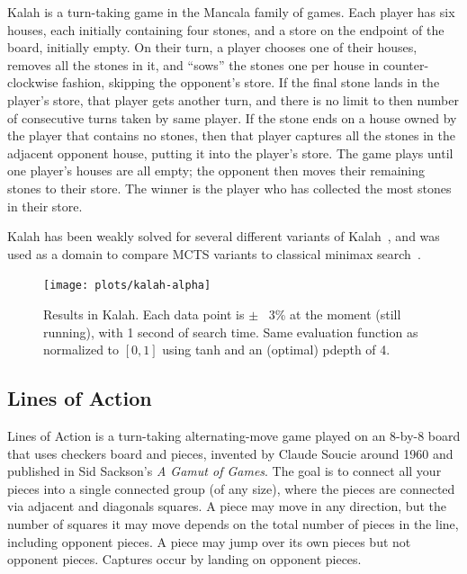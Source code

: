 \documentclass[letterpaper]{article}
\begin{document}
Kalah is a turn-taking game in the Mancala family of games. Each player has six houses, each 
initially containing four stones, and a store on the endpoint of the board, initially empty. 
On their turn, a player chooses one of their houses, removes all the stones in it, and ``sows'' 
the stones one per house in counter-clockwise fashion, skipping the opponent's store. 
If the final stone lands in the player's store, that player gets another turn, and there is no 
limit to then number of consecutive turns taken by same player. If the stone ends on a house owned
by the player that contains no stones, then that player captures all the stones in the adjacent 
opponent house, putting it into the player's store. The game plays until one player's houses are
all empty; the opponent then moves their remaining stones to their store. The winner is the player
who has collected the most stones in their store. 

Kalah has been weakly solved for several different variants of Kalah~\cite{Irving00Solving}, 
and was used as a domain to compare MCTS variants to classical minimax search~\cite{Ramanujan11Tradeoffs}.


\begin{figure}[t]
\begin{center}
\texttt{[image: plots/kalah-alpha]}
\caption{Results in Kalah. Each data point is $\pm$ ~3\% at the moment (still running), with 1 second of search time. 
Same evaluation function as \cite{Ramanujan11Tradeoffs} normalized to $[0,1]$ using tanh and an (optimal) pdepth of 4.} 
\label{fig:loa-alpha}
\end{center}
\end{figure}

\subsection{Lines of Action}

Lines of Action is a turn-taking alternating-move game played on an 8-by-8 board that uses checkers board and pieces, 
invented by Claude Soucie around 1960 and published in Sid Sackson's {\it A Gamut of Games}. 
The goal is to connect all your pieces into a single connected group (of any size), 
where the pieces are connected via adjacent and diagonals squares. A piece may move in any direction, but the number of squares 
it may move depends on the total number of pieces in the line, including opponent pieces. A piece may jump over its own
pieces but not opponent pieces. Captures occur by landing on opponent pieces. 
\end{document}
